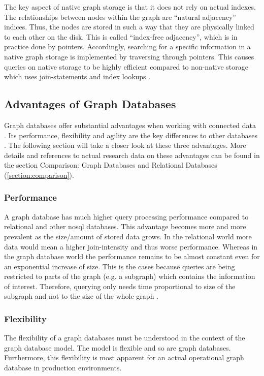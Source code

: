 
The key aspect of native graph storage is that it does not rely on actual indexes. The relationships between nodes within the graph are “natural adjacency”\autocite{graphdb2015}  indices. Thus, the nodes are stored in such a way that they are physically linked to each other on the disk. This is called “index-free adjacency”\autocite{graphdb2015}, which is in practice done by pointers. Accordingly, searching for a specific information in a native graph storage is implemented by traversing through pointers. This causes queries on native storage to be highly efficient compared to non-native storage which uses join-statements and index lookups \autocite{graphdb2015} .

\subsection{Advantages of Graph Databases}
Graph databases offer substantial advantages when working with connected data \autocite{maheshlal2015}. Its performance, flexibility and agility are the key differences to other databases \autocite{graphdb2015}. The following section will take a closer look at these three advantages. More details and references to actual research data on these advantages can be found in the section Comparison: Graph Databases and Relational Databases (\ref{section:comparison}).

\subsubsection{Performance}
A graph database has much higher query processing performance compared to relational and other \gls{nosql} databases. This advantage becomes more and more prevalent as the size/amount of stored data grows. In the relational world more data would mean a higher join-intensity and thus worse performance. Whereas in the graph database world the performance remains to be almost constant even for an exponential increase of size. This is the cases because queries are being restricted to parts of the graph (e.g. a subgraph) which contains the information of interest.  Therefore, querying only needs time proportional to size of the subgraph and not to the size of the whole graph \autocite{maheshlal2015, graphdb2015}.

\subsubsection{Flexibility}
The flexibility of a graph databases must be understood in the context of the graph database model. The model is flexible and so are graph databases. Furthermore, this flexibility is most apparent for an actual operational graph database in production environments.

